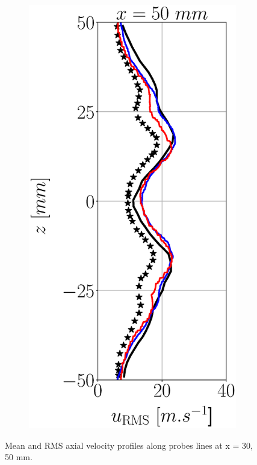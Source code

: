 \begin{figure}[h!]
\begin{subfigure}[b]{0.22\textwidth}
\end{subfigure}
   \hspace{0.05in}
\begin{subfigure}[b]{0.22\textwidth}
	\centering
   \includegraphics[scale=0.25]{./part3_applications/figures_ch7_aero/BIMER_validation_quantitative_lines/x50_u_axial_rms.eps}
\end{subfigure}
\caption{Mean and RMS axial velocity profiles along probes lines at x = 30, 50 mm.}
\label{fig:BIMER_quantitative_validation_axial_velocities}
\end{figure}



